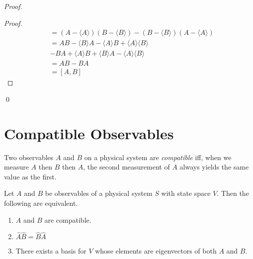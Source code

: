\begin{proof}
\pf
{}
\begin{proof}
	\pf
	\begin{align*}
		[\hat{A_1}, \hat{B_1}] & = (A - \langle A \rangle)(B - \langle B \rangle) - (B - \langle B \rangle) (A - \langle A \rangle)\\
		& = AB - \langle B \rangle A - \langle A \rangle B + \langle A \rangle \langle B \rangle \\
		& - BA + \langle A \rangle B + \langle B \rangle A - \langle A \rangle \langle B \rangle \\
		& = AB - BA \\
		& = [A,B]
	\end{align*}
\end{proof}
\qed
\end{proof}

\section{Compatible Observables}

\begin{df}[Compatible]
Two observables $A$ and $B$ on a physical system are \emph{compatible} iff, when we measure $A$ then $B$ then $A$, the second measurement of $A$ always yields the same value as the first.
\end{df}

\begin{prop}
Let $A$ and $B$ be observables of a physical system $S$ with state space $V$. Then the following are equivalent.
\begin{enumerate}
\item $A$ and $B$ are compatible.
\item $\hat{A} \hat{B} = \hat{B} \hat{A}$
\item There exists a basis for $V$ whose elements are eigenvectors of both $A$ and $B$.
\end{enumerate}
\end{prop}

